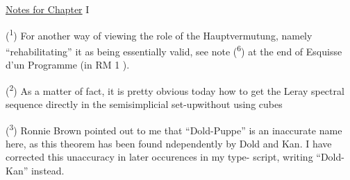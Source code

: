 
\uline{Notes for Chapter} I

(\textsuperscript{1}) For another way of viewing the role of the Hauptvermutung, namely
``rehabilitating'' it as being essentially valid, see note (\textsuperscript{6}) at the end
of Esquisse d'un Programme (in RM 1 ).

(\textsuperscript{2}) As a matter of fact, it is pretty obvious today how to get the
Leray spectral sequence directly in the semisimplicial set-up\hand{,}without
using cubes

(\textsuperscript{3}) Ronnie Brown pointed out to me that ``Dold-Puppe'' is an inaccurate
 name here, as this theorem has been found ndependently by Dold and
Kan. I have corrected this unaccuracy in later occurences in my type-%
script, writing ``Dold-Kan'' instead.

